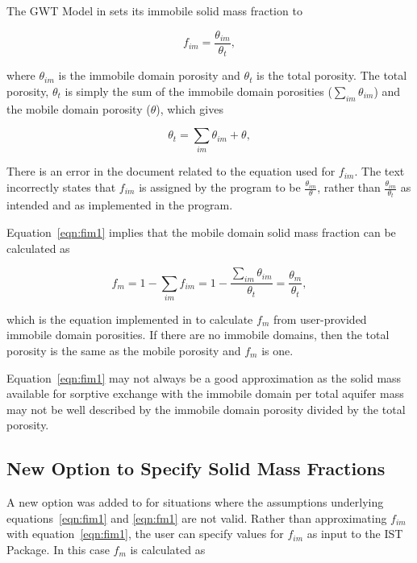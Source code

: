 The GWT Model in \mf sets its immobile solid mass fraction to

\begin{equation}
\label{eqn:fim1}
f_{im} = \frac{\theta_{im}}{\theta_t},
\end{equation}

\noindent where $\theta_{im}$ is the immobile domain porosity and $\theta_t$ is the total porosity.  The total porosity, $\theta_t$ is simply the sum of the immobile domain porosities ($\sum_{im}{\theta_{im}}$) and the mobile domain porosity ($\theta$), which gives

\begin{equation}
\label{eqn:thetat1}
\theta_t = \sum_{im}{\theta_{im}} + \theta,
\end{equation}

\noindent There is an error in the \cite{modflow6gwt} document related to the equation used for $f_{im}$.  The text incorrectly states that $f_{im}$ is assigned by the program to be $\frac{\theta_{im}}{\theta}$, rather than $\frac{\theta_{im}}{\theta_t}$ as intended and as implemented in the \mf program.

Equation~\ref{eqn:fim1} implies that the mobile domain solid mass fraction can be calculated as

\begin{equation}
\label{eqn:fm1}
f_m = 1 - \sum_{im}f_{im} = 1 - \frac{\sum_{im}\theta_{im}}{\theta_t} = \frac{\theta_{m}}{\theta_t},
\end{equation}

\noindent which is the equation implemented in \mf to calculate $f_m$ from user-provided immobile domain porosities.  If there are no immobile domains, then the total porosity is the same as the mobile porosity and $f_m$ is one.

Equation~\ref{eqn:fim1} may not always be a good approximation as the solid mass available for sorptive exchange with the immobile domain per total aquifer mass may not be well described by the immobile domain porosity divided by the total porosity.

\subsection{New Option to Specify Solid Mass Fractions} \label{sec:solidmassfrac2}

A new option was added to \mf for situations where the assumptions underlying equations~\ref{eqn:fim1} and \ref{eqn:fm1} are not valid.  Rather than approximating $f_{im}$ with equation~\ref{eqn:fim1}, the user can specify values for $f_{im}$ as input to the IST Package.  In this case $f_m$ is calculated as

